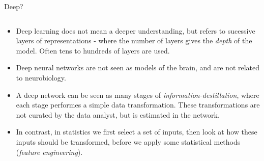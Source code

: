 \documentclass[10pt,ignorenonframetext,]{beamer}
\providecommand{\tightlist}{%
  \setlength{\itemsep}{0pt}\setlength{\parskip}{0pt}}
\begin{document}
\begin{frame}

\begin{block}{Deep?}

\(~\)

\begin{itemize}
\tightlist
\item
  Deep learning does not mean a deeper understanding, but refers to
  sucessive layers of representations - where the number of layers gives
  the \emph{depth} of the model. Often tens to hundreds of layers are
  used.
\end{itemize}

\vspace{2mm}

\begin{itemize}
\tightlist
\item
  Deep neural networks are not seen as models of the brain, and are not
  related to neurobiology.
\end{itemize}

\vspace{2mm}

\begin{itemize}
\tightlist
\item
  A deep network can be seen as many stages of
  \emph{information-destillation}, where each stage performes a simple
  data transformation. These transformations are not curated by the data
  analyst, but is estimated in the network.
\end{itemize}

\vspace{2mm}

\begin{itemize}
\tightlist
\item
  In contrast, in statistics we first select a set of inputs, then look
  at how these inputs should be transformed, before we apply some
  statistical methods (\emph{feature engineering}).
\end{itemize}

\end{block}

\end{frame}
\end{document}
